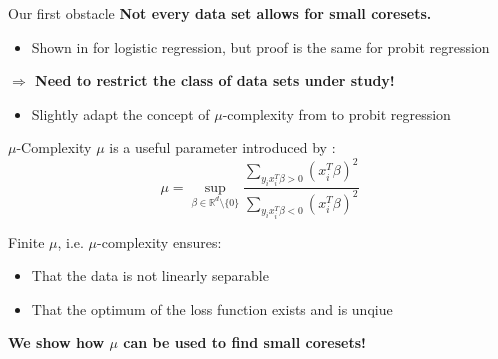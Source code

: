 \documentclass[gray]{beamer}
\begin{document}
\begin{frame}{Our first obstacle}
    \textbf{Not every data set allows for small coresets.}
    \begin{itemize}
        \item Shown in \cite{on-coresets} for logistic regression,
              but proof is the same for probit regression
    \end{itemize}

    \vspace{\fill}

    \textbf{$\Rightarrow$ Need to restrict the class of data sets under study!}
    \begin{itemize}
        \item Slightly adapt the concept of $\mu$-complexity from
              \cite{on-coresets} to probit regression
    \end{itemize}
\end{frame}

\begin{frame}{$\mu$-Complexity}
    $\mu$ is a useful parameter introduced by \cite{on-coresets}:
    \begin{equation*}
        \mu = \sup_{\beta \in \mathbb{R}^d \setminus \{0\} }
        \frac{\sum_{y_ix_i^T\beta > 0} (x_i^T \beta)^2}
        {\sum_{y_ix_i^T\beta < 0}(x_i^T \beta)^2}
    \end{equation*}

    \vspace{\fill}

    Finite $\mu$, i.e. $\mu$-complexity ensures:
    \begin{itemize}
        \item That the data is not linearly separable
        \item That the optimum of the loss function exists and is unqiue
    \end{itemize}

    \vspace{\fill}

    \textbf{We show how $\mu$ can be used to find small coresets!}
\end{frame}
\end{document}
